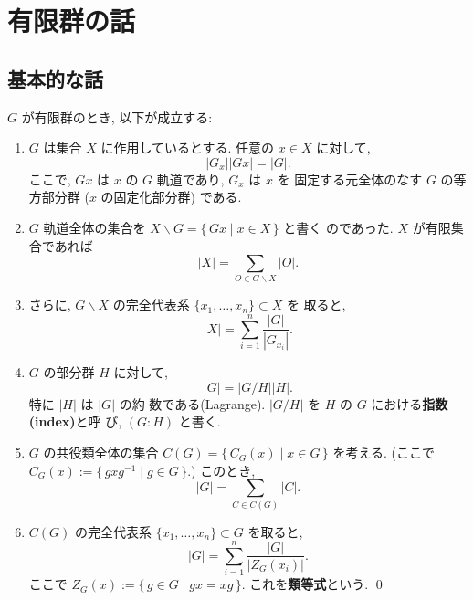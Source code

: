 \documentclass[12pt,twoside]{jarticle}
\begin{document}

\section{有限群の話}


\subsection{基本的な話}
\label{sec:fundamental}

\begin{question}
  $G$ が有限群のとき, 以下が成立する:
  \begin{enumerate}
  \item $G$ は集合 $X$ に作用しているとする. 任意の $x\in X$ に対して,
    $$|G_x||Gx|=|G|.$$ ここで, $Gx$ は $x$ の $G$ 軌道であり, $G_x$ は $x$ を
    固定する元全体のなす $G$ の等方部分群 ($x$ の固定化部分群) である.
  \item $G$ 軌道全体の集合を $X\backslash G = \{\,Gx\mid x\in X\,\}$ と書く
    のであった. 
    $X$ が有限集合であれば $$|X| = \sum_{O\in G\backslash X} |O|.$$
  \item さらに, $G\backslash X$ の完全代表系 $\{x_1,\dots,x_n\}\subset X$ を
    取ると, $$|X| = \sum_{i=1}^n \frac{|G|}{|G_{x_i}|}.$$
  \item $G$ の部分群 $H$ に対して, $$|G|=|G/H||H|.$$ 特に $|H|$ は $|G|$ の約
    数である(Lagrange). $|G/H|$ を $H$ の $G$ における{\bf 指数 (index)}と呼
    び, $(G:H)$ と書く.
  \item $G$ の共役類全体の集合 $C(G) = \{\,C_G(x)\mid x\in G\,\}$ を考える.
    (ここで $C_G(x) := \{\, gxg^{-1} \mid g\in G \,\}$.) このとき,
    $$|G| = \sum_{C\in C(G)}|C|.$$
  \item $C(G)$ の完全代表系 $\{x_1,\dots,x_n\}\subset G$ を取ると, 
    $$|G| = \sum_{i=1}^n \frac{|G|}{|Z_G(x_i)|}.$$
    ここで $Z_G(x) := \{\,g\in G\mid gx=xg\,\}$.
    これを{\bf 類等式}という.
  \qed
  \end{enumerate}
\end{question}
\end{document}
